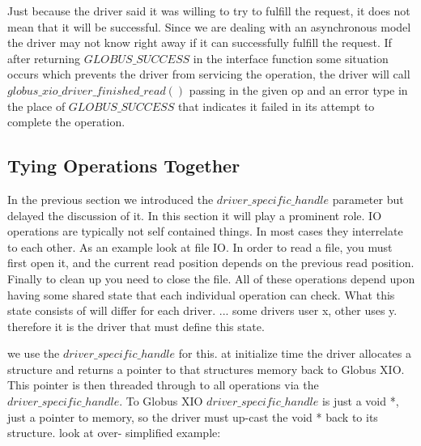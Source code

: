 \documentclass[11pt]{article}
\begin{document}
Just because the driver said it was willing to try to fulfill the
request, it does not mean that it will be successful.  Since we are
dealing with an asynchronous model the driver may not know right away
if it can successfully fulfill the request.  If after returning 
$GLOBUS\_SUCCESS$ in the interface function some situation occurs 
which prevents the driver from servicing
the operation, the driver will call $globus\_xio\_driver\_finished\_read()$
passing in the given op and an error type in the place of $GLOBUS\_SUCCESS$
that indicates it failed in its attempt to complete the operation.

\subsection{Tying Operations Together}
In the previous section we introduced the $driver\_specific\_handle$ parameter
but delayed the discussion of it.  In this section it will play a 
prominent role.  IO operations are typically not self contained things.
In most cases they interrelate to each other.  As an example look at file
IO.  In order to read a file, you must first open it, and the current
read position depends on the previous read position.  Finally to clean up
you need to close the file.  All of these operations depend upon having some
shared state that each individual operation can check.  What this state
consists of will differ for each driver.  ...
some drivers user x, other uses y.  therefore it is the driver that must 
define this state.

we use the $driver\_specific\_handle$ for this.  at initialize time the
driver allocates a structure and returns a pointer to that structures
memory back to Globus XIO.  This pointer is then threaded through to all
operations via the $driver\_specific\_handle$.  To Globus XIO
$driver\_specific\_handle$ is just a void *, just a pointer to memory, so 
the driver must up-cast the void * back to its structure.  look at over-
simplified example:
\end{document}
